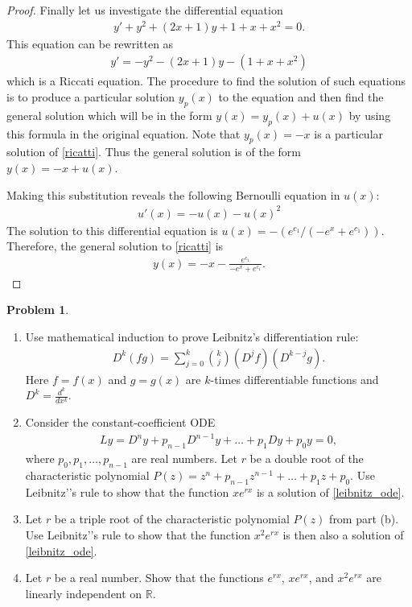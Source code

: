\documentclass[12pt]{article}
\theoremstyle{definition}
\newtheorem{problem}{Problem}
\begin{document}
\begin{proof}
  Finally let us investigate the differential equation
  \begin{align*}
    y' + y^2 +(2x+1)y + 1 + x + x^2 = 0.
  \end{align*}
  This equation can be rewritten as
  \begin{align}\label{ricatti}
    y' = -y^2 -(2x+1)y - (1 + x + x^2)
  \end{align}
  which is a Riccati equation. The procedure to find the solution of such
  equations is to produce a particular solution $y_p(x)$ to the equation and then find the
  general solution which will be in the form $y(x) = y_p(x) + u(x)$ by using this formula in
  the original equation. Note that $y_p(x) = -x$ is a particular solution
  of \eqref{ricatti}. Thus the general solution is of the form $y(x) = -x + u(x)$.

  Making this substitution reveals the following Bernoulli equation in $u(x)$:
  \begin{align*}
    u'(x) = -u(x) -u(x)^2
  \end{align*}
  The solution to this differential equation is $u(x) = -(e^{c_1}/(-e^x + e^{c_1}))$.
  Therefore, the general solution to \eqref{ricatti} is
  \begin{align*}
    y(x)=-x-\frac{e^{c_1}}{-e^x + e^{c_1}}.
  \end{align*}
\end{proof}
\newpage


\begin{problem}
  \begin{enumerate}
    \item Use mathematical induction to prove Leibnitz's differentiation rule:
      \begin{align*}
        D^{k}(fg) = \sum_{j=0}^k \binom{k}{j}(D^j f) (D^{k-j}g).
      \end{align*}
      Here $f = f(x)$ and $g=g(x)$ are $k$-times differentiable functions and $D^k = \frac{d^k}{dx^k}$.
    \item Consider the constant-coefficient ODE
      \begin{align}\label{leibnitz_ode}
        Ly = D^n y + p_{n-1}D^{n-1}y + \dots + p_1 Dy + p_0 y = 0,
      \end{align}
      where $p_0, p_1, \dots, p_{n-1}$ are real numbers. Let $r$ be a double root of the characteristic polynomial
      $P(z) = z^n + p_{n-1} z^{n-1} + \dots + p_1 z + p_0.$ Use Leibnitz’'s rule to
      show that the function $xe^{rx}$ is a solution of \eqref{leibnitz_ode}.
    \item Let $r$ be a triple root of the characteristic polynomial $P(z)$ from part (b).
      Use Leibnitz'’s rule to show that the function $x^2 e^{rx}$
      is then also a solution of \eqref{leibnitz_ode}.
    \item Let $r$ be a real number. Show that the functions $e^{rx}$, $xe^{rx}$, and $x^2 e^{rx}$
      are linearly independent on $\mathbb{R}$.
  \end{enumerate}
\end{problem}
\end{document}
